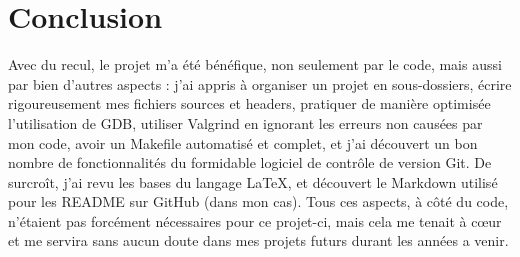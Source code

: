 \documentclass[11pt]{article}
\begin{document}
\section{Conclusion}

Avec du recul, le projet m'a été bénéfique, non seulement par le code, mais
aussi par bien d'autres aspects : j'ai appris à organiser un projet en
sous-dossiers, écrire rigoureusement mes fichiers sources et headers, pratiquer
de manière optimisée l'utilisation de GDB, utiliser Valgrind en ignorant les
erreurs non causées par mon code, avoir un Makefile automatisé et complet, et
j'ai découvert un bon nombre de fonctionnalités du formidable logiciel de
contrôle de version Git.  De surcroît, j'ai revu les bases du langage LaTeX, et
découvert le Markdown utilisé pour les README sur GitHub (dans mon cas). Tous
ces aspects, à côté du code, n'étaient pas forcément nécessaires pour ce
projet-ci, mais cela me tenait à cœur et me servira sans aucun doute dans mes
projets futurs durant les années a venir.
\end{document}
